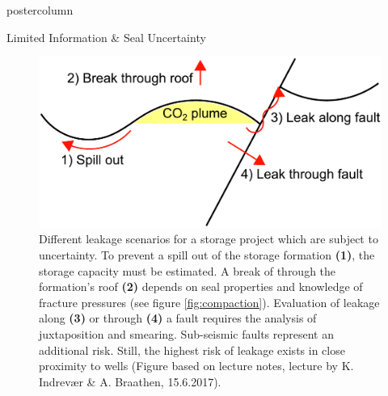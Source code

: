 \documentclass{beamer}
\begin{document}
\begin{frame}
\begin{columns}
\begin{column}{.618\textwidth}
\begin{beamercolorbox}[center]{postercolumn}
\begin{minipage}{.98\textwidth}
{\begin{myblock}{Limited Information \& Seal Uncertainty}
\begin{figure}
\begin{minipage}{0.95\textwidth}
\begin{minipage}[t]{0.22\textwidth}
{			} \label{fig:compaction}
		\end{minipage}\hfill
		\begin{minipage}[t]{0.38\textwidth}
			\vspace{0pt}
			\includegraphics[width=\textwidth]{figures/leakage.pdf}
			\caption{
			Different leakage scenarios for a  storage project which are subject to uncertainty. To prevent a spill out of the storage formation \textbf{(1)}, the storage capacity must be estimated. A break of  through the formation's roof \textbf{(2)} depends on seal properties and knowledge of fracture pressures (see figure \ref{fig:compaction}). Evaluation of leakage along \textbf{(3)} or through \textbf{(4)} a fault requires the analysis of juxtaposition and smearing. Sub-seismic faults represent an additional risk. Still, the highest risk of leakage exists in close proximity to wells (Figure based on lecture notes, lecture by K. Indrevær \& A. Braathen, 15.6.2017).
			} \label{fig:leakage}
		\end{minipage}
	\end{minipage}
\end{figure}
	


\end{myblock}\vfill					
					
}
\end{minipage}
\end{beamercolorbox}
\end{column}
\end{columns}
\end{frame}
\end{document}
